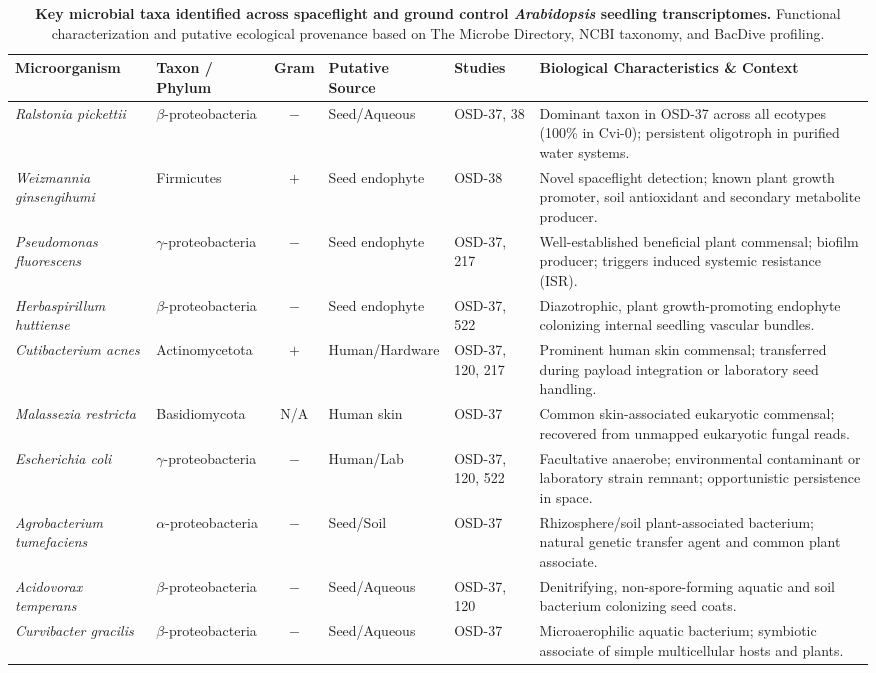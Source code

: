 \begin{table}[t]
\centering
\small
\caption{\textbf{Key microbial taxa identified across spaceflight and ground control \textit{Arabidopsis} seedling transcriptomes.} Functional characterization and putative ecological provenance based on The Microbe Directory, NCBI taxonomy, and BacDive profiling.}
\label{tab:taxa}
\begin{tabularx}{\textwidth}{@{}p{3.2cm} p{2.2cm} c p{2.4cm} p{1.5cm} X@{}}
\toprule
\textbf{Microorganism} & \textbf{Taxon / Phylum} & \textbf{Gram} & \textbf{Putative Source} & \textbf{Studies} & \textbf{Biological Characteristics \& Context} \\
\midrule
\textit{Ralstonia pickettii} & $\beta$-proteobacteria & $-$ & Seed/Aqueous & OSD-37, 38 & Dominant taxon in OSD-37 across all ecotypes (100\% in Cvi-0); persistent oligotroph in purified water systems. \\
\textit{Weizmannia ginsengihumi} & Firmicutes & $+$ & Seed endophyte & OSD-38 & Novel spaceflight detection; known plant growth promoter, soil antioxidant and secondary metabolite producer. \\
\textit{Pseudomonas fluorescens} & $\gamma$-proteobacteria & $-$ & Seed endophyte & OSD-37, 217 & Well-established beneficial plant commensal; biofilm producer; triggers induced systemic resistance (ISR). \\
\textit{Herbaspirillum huttiense} & $\beta$-proteobacteria & $-$ & Seed endophyte & OSD-37, 522 & Diazotrophic, plant growth-promoting endophyte colonizing internal seedling vascular bundles. \\
\textit{Cutibacterium acnes} & Actinomycetota & $+$ & Human/Hardware & OSD-37, 120, 217 & Prominent human skin commensal; transferred during payload integration or laboratory seed handling. \\
\textit{Malassezia restricta} & Basidiomycota & N/A & Human skin & OSD-37 & Common skin-associated eukaryotic commensal; recovered from unmapped eukaryotic fungal reads. \\
\textit{Escherichia coli} & $\gamma$-proteobacteria & $-$ & Human/Lab & OSD-37, 120, 522 & Facultative anaerobe; environmental contaminant or laboratory strain remnant; opportunistic persistence in space. \\
\textit{Agrobacterium tumefaciens} & $\alpha$-proteobacteria & $-$ & Seed/Soil & OSD-37 & Rhizosphere/soil plant-associated bacterium; natural genetic transfer agent and common plant associate. \\
\textit{Acidovorax temperans} & $\beta$-proteobacteria & $-$ & Seed/Aqueous & OSD-37, 120 & Denitrifying, non-spore-forming aquatic and soil bacterium colonizing seed coats. \\
\textit{Curvibacter gracilis} & $\beta$-proteobacteria & $-$ & Seed/Aqueous & OSD-37 & Microaerophilic aquatic bacterium; symbiotic associate of simple multicellular hosts and plants. \\
\bottomrule
\end{tabularx}
\end{table}
